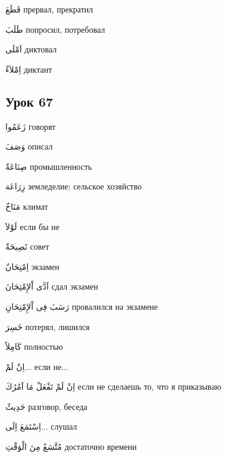 \documentclass[a5paper]{article}
\newcommand\textstyleDropCaps[1]{#1}
\newcommand\textstyleCaptioncharacters[1]{#1}
\begin{document}
\textstyleCaptioncharacters{قَطَعَ }\textstyleDropCaps{прервал, прекратил‎}

\textstyleCaptioncharacters{طَلَبَ }\textstyleDropCaps{попросил, потребо­вал‎}

\textstyleCaptioncharacters{اَمْلَى }\textstyleDropCaps{диктовал‎}

\textstyleCaptioncharacters{اِمْلاَءٌ }\textstyleDropCaps{диктант‎}

\subsection[Урок 67‎]{\textstyleDropCaps{Урок 67‎}}
\textstyleCaptioncharacters{زَعَمُوا }\textstyleDropCaps{говорят‎}

\textstyleCaptioncharacters{وَصَفَ }\textstyleDropCaps{описал‎}

\textstyleCaptioncharacters{صِنَاعَةٌ }\textstyleDropCaps{промышленность‎}

\textstyleCaptioncharacters{زِرَاعَة }\textstyleDropCaps{земледелие; сель­ское хозяйство‎}

\textstyleCaptioncharacters{مَنَاخٌ }\textstyleDropCaps{климат‎}

\textstyleCaptioncharacters{لَوْلاَ }\textstyleDropCaps{если бы не‎}

\textstyleCaptioncharacters{نََصِيحَةٌ }\textstyleDropCaps{совет‎}

\textstyleCaptioncharacters{اِمْتِحَانٌ }\textstyleDropCaps{экзамен‎}

\textstyleCaptioncharacters{اَدَّى اْلإِمْتِحَانَ }\textstyleDropCaps{сдал эк­замен‎}

\textstyleCaptioncharacters{رَسَبَ فِى اْلإِمْتِحَانِ }\textstyleDropCaps{провалился на экзамене‎}

\textstyleCaptioncharacters{خَسِرَ }\textstyleDropCaps{потерял, лишился‎}

\textstyleCaptioncharacters{كَامِلاً }\textstyleDropCaps{полностью‎}

\textstyleCaptioncharacters{اِنْ لَمْ...ِ }\textstyleDropCaps{если не...‎}

\textstyleCaptioncharacters{اِنْ لَمْ تَفْعَلْ مَا آمُرُكَ }\textstyleDropCaps{если не сделаешь то, что я приказываю‎}

\textstyleCaptioncharacters{حَدِيثٌ }\textstyleDropCaps{разговор, беседа‎}

\textstyleCaptioncharacters{اِسْتَمَعَ اِلَى...ِ }\textstyleDropCaps{слушал‎}

\textstyleCaptioncharacters{مُتَّسَعٌ مِنَ الْوَقْتِ }\textstyleDropCaps{до­статочно времени‎}
\end{document}

